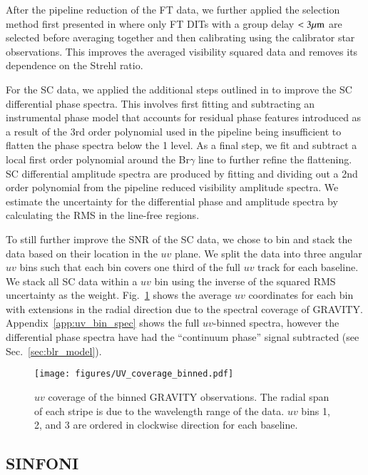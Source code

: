 \documentclass[longauth,]{aa}
\newcommand{\brg}{Br$\gamma$}
\begin{document}
After the pipeline reduction of the FT data, we further applied the selection method first presented in  where only FT DITs with a group delay $<3\mu{\rm m}$ are selected before averaging together and then calibrating using the calibrator star observations. This improves the averaged visibility squared data and removes its dependence on the Strehl ratio. 

For the SC data, we applied the additional steps outlined in  to improve the SC differential phase spectra. This involves first fitting and subtracting an instrumental phase model that accounts for residual phase features introduced as a result of the 3rd order polynomial used in the pipeline being insufficient to flatten the phase spectra below the 1\degree{} level. As a final step, we fit and subtract a local first order polynomial around the \brg{} line to further refine the flattening. SC differential amplitude spectra are produced by fitting and dividing out a 2nd order polynomial from the pipeline reduced visibility amplitude spectra. We estimate the uncertainty for the differential phase and amplitude spectra by calculating the RMS in the line-free regions.

To still further improve the SNR of the SC data, we chose to bin and stack the data based on their location in the $uv$ plane. We split the data into three angular $uv$ bins such that each bin covers one third of the full $uv$ track for each baseline. We stack all SC data within a $uv$ bin using the inverse of the squared RMS uncertainty as the weight. Fig.~\ref{fig:uvbin_cov} shows the average $uv$ coordinates for each bin with extensions in the radial direction due to the spectral coverage of GRAVITY. 
Appendix~\ref{app:uv_bin_spec} shows the full $uv$-binned spectra, however the differential phase spectra have had the ``continuum phase'' signal subtracted (see Sec.~\ref{sec:blr_model}).

\begin{figure}
\centering
\texttt{[image: figures/UV\_coverage\_binned.pdf]}
\caption{$uv$ coverage of the binned GRAVITY observations. The radial span of each stripe is due to the wavelength range of the data. $uv$ bins 1, 2, and 3 are ordered in clockwise direction for each baseline.}
\label{fig:uvbin_cov}
\end{figure}


\subsection{SINFONI}
\end{document}
